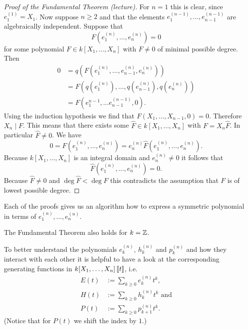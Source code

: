 \begin{proof}[Proof of the Fundamental Theorem (lecture)]
  For $n = 1$ this is clear, since $e^{(1)}_1 = X_1$. Now suppose $n \geq 2$ and that the elements $e^{(n-1)}_1, \ldots, e^{(n-1)}_{n-1}$ are algebraically independent. Suppose that
  \[
   F\left(e^{(n)}_1, \ldots, e^{(n)}_n\right) = 0
  \]
  for some polynomial $F \in k[X_1, \ldots, X_n]$ with $F \neq 0$ of minimal possible degree. Then
  \begin{align*}
   0
   &= q\left(F\left(e^{(n)}_1, \ldots, e^{(n)}_{n-1} ,e^{(n)}_n\right)\right) \\
   &= F\left( q\left(e^{(n)}_1\right), \ldots, q\left(e^{(n)}_{n-1}\right), q\left(e^{(n)}_n\right) \right) \\
   &= F\left( e^{n-1}_1, \ldots e^{(n-1)}_{n-1}, 0 \right).
  \end{align*}
  Using the induction hypothesis we find that $F(X_1, \ldots, X_{n-1}, 0) = 0$. Therefore $X_n \mid F$. This means that there exists some $\hat{F} \in k[X_1, \ldots, X_n]$ with $F = X_n \hat{F}$. In particular $\hat{F} \neq 0$. We have
  \[
   0
   = F\left(e^{(n)}_1, \ldots, e^{(n)}_n\right)
   = e^{(n)}_n \hat{F}\left(e^{(n)}_1, \ldots, e^{(n)}_n\right).
  \]
  Because $k[X_1, \ldots, X_n]$ is an integral domain and $e^{(n)}_n \neq 0$ it follows that
  \[
   \hat{F}\left(e^{(n)}_1, \ldots, e^{(n)}_n\right) = 0.
  \]
  Because $\hat{F} \neq 0$ and $\deg \hat{F} < \deg F$ this contradicts the assumption that $F$ is of lowest possible degree.
\end{proof}


\begin{rem}
 Each of the proofs gives us an algorithm how to express a symmetric polynomial in terms of $e^{(n)}_1, \ldots, e^{(n)}_n$.
\end{rem}


\begin{rem}
 The Fundamental Theorem also holds for $k = \mathbb{Z}$.
\end{rem}


To better understand the polynomials $e^{(n)}_k$, $h^{(n)}_k$ and $p^{(n)}_k$ and how they interact with each other it is helpful to have a look at the corresponding generating functions in $k[X_1, \ldots, X_n]\left[\!\left[t\right]\!\right]$, i.e.
\begin{align*}
 E(t) &:= \sum_{k \geq 0} e^{(n)}_k t^k, \\
 H(t) &:= \sum_{k \geq 0} h^{(n)}_k t^k \text{ and} \\
 P(t) &:= \sum_{k \geq 0} p^{(n)}_{k+1} t^k.
\end{align*}
(Notice that for $P(t)$ we shift the index by $1$.)


